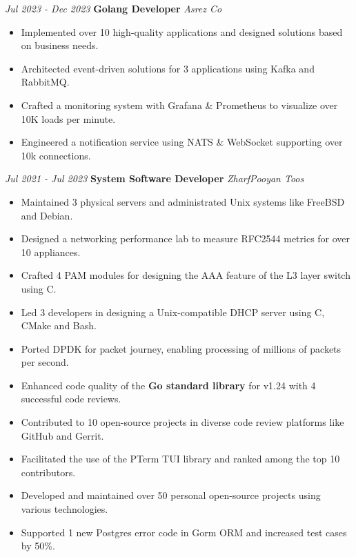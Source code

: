 \documentclass{engineercv}
\begin{document}
\begin{twocolentry}{\textit{Jul 2023 - Dec 2023}}
  \textbf{Golang Developer}
  \textit{Asrez Co}
\end{twocolentry}

\begin{itemize}
  \item Implemented over 10 high-quality applications and designed solutions based on business needs.
  \item Architected event-driven solutions for 3 applications using Kafka and RabbitMQ.
  \item Crafted a monitoring system with Grafana \& Prometheus to visualize over 10K loads per minute.
  \item Engineered a notification service using NATS \& WebSocket supporting over 10k connections.
\end{itemize}

\begin{twocolentry}{\textit{Jul 2021 - Jul 2023}}
  \textbf{System Software Developer}
  \textit{ZharfPooyan Toos}
\end{twocolentry}

\begin{itemize}
  \item Maintained 3 physical servers and administrated Unix systems like FreeBSD and Debian.
  \item Designed a networking performance lab to measure RFC2544 metrics for over 10 appliances.
  \item Crafted 4 PAM modules for designing the AAA feature of the L3 layer switch using C.
  \item Led 3 developers in designing a Unix-compatible DHCP server using C, CMake and Bash.
  \item Ported DPDK for packet journey, enabling processing of millions of packets per second.
\end{itemize}

\begin{itemize}
  \item Enhanced code quality of the \textbf{Go standard library} for v1.24 with 4 successful code reviews.
  \item Contributed to 10 open-source projects in diverse code review platforms like GitHub and Gerrit.
  \item Facilitated the use of the PTerm TUI library and ranked among the top 10 contributors.
  \item Developed and maintained over 50 personal open-source projects using various technologies.
  \item Supported 1 new Postgres error code in Gorm ORM and increased test cases by 50\%.
\end{itemize}
\end{document}
